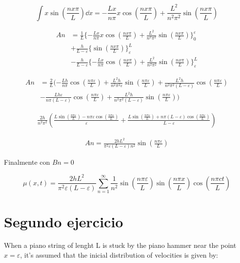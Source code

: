 \documentclass[11pt]{report}
\theoremstyle{plain}
\theoremstyle{definition}
\begin{document}
\begin{equation*}
	\int x\sin(\frac{nx\pi}{L})\dd{x} = -\frac{Lx}{n\pi}x\cos(\frac{nx\pi}{L}) + \frac{L^2}{n^2\pi^2}\sin(\frac{nx\pi}{L}) 
\end{equation*}

\begin{align*}
	An &=\frac{1}{L} \lbrace -\frac{Lx}{n\pi}x\cos(\frac{nx\pi}{L}) + \frac{L^2}{n^2\pi^2}\sin(\frac{nx\pi}{L})\rbrace^\varepsilon_0 \\
	&+ \frac{h}{L-\varepsilon}\lbrace\sin(\frac{nx\pi}{L})\rbrace^L_\varepsilon \\
	&- \frac{h}{L-\varepsilon}\lbrace -\frac{Lx}{n\pi}\cos(\frac{nx\pi}{L}) + \frac{L^2}{n^2\pi^2}\sin(\frac{nx\pi}{L})\rbrace^L_\varepsilon
\end{align*}

\begin{align*}
	An &= \frac{2}{L}(-\frac{Lh}{n\pi}\cos(\frac{n\pi\varepsilon}{L}) + \frac{L^2h}{n^2\pi^2\varepsilon}\sin(\frac{n\pi\varepsilon}{L}) + \frac{L^2h}{n^2\pi^2(L-\varepsilon)}\cos(\frac{n\pi\varepsilon}{L}) \\
	&- \frac{Lh\varepsilon}{n\pi(L-\varepsilon)}\cos(\frac{n\pi\varepsilon}{L}) +\frac{L^2h}{n^2\pi^2(L-\varepsilon)}\sin(\frac{n\pi\varepsilon}{L}))
\end{align*}

\begin{align*}
	\frac{2h}{n^2\pi^2}\left(\frac{L\sin(\frac{n\pi\varepsilon}{L})-n\pi\varepsilon\cos(\frac{n\pi\varepsilon}{L})}{\varepsilon} + \frac{L\sin(\frac{n\pi\varepsilon}{L})+n\pi(L-\varepsilon)\cos(\frac{n\pi\varepsilon}{L})}{L-\varepsilon}\right)
\end{align*}

\begin{align*}
	An = \frac{2hL^2}{\pi^2\varepsilon(L-\varepsilon)n^2}\sin(\frac{n\pi\varepsilon}{L})
\end{align*}

Finalmente con $Bn=0$

\begin{equation*}
	\mu(x,t)=\frac{2hL^2}{\pi^2\varepsilon(L-\varepsilon)}\sum^\infty_{n=1}\frac{1}{n^2}\sin(\frac{n\pi\varepsilon}{L})\sin(\frac{n\pi x}{L})\cos(\frac{n\pi ct}{L})
\end{equation*}


\section{Segundo ejercicio}
When a piano string of lenght L is stuck by the piano hammer near the point $x=\varepsilon$, it's assumed that the inicial distribution of velocities is given by:
\end{document}
